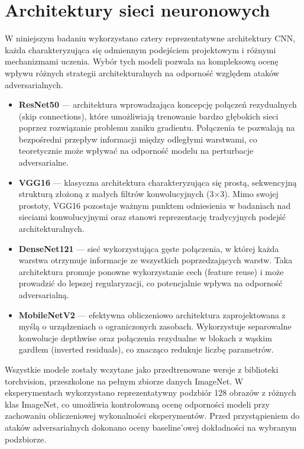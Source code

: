\documentclass[12pt]{article}
\begin{document}
\section{Architektury sieci neuronowych}

W niniejszym badaniu wykorzystano cztery reprezentatywne architektury CNN, każda charakteryzująca się odmiennym podejściem projektowym i różnymi mechanizmami uczenia. Wybór tych modeli pozwala na kompleksową ocenę wpływu różnych strategii architekturalnych na odporność względem ataków adversarialnych.

\begin{itemize}
    \item \textbf{ResNet50} \cite{he2016deep} --- architektura wprowadzająca koncepcję połączeń rezydualnych (skip connections), które umożliwiają trenowanie bardzo głębokich sieci poprzez rozwiązanie problemu zaniku gradientu. Połączenia te pozwalają na bezpośredni przepływ informacji między odległymi warstwami, co teoretycznie może wpływać na odporność modelu na perturbacje adversarialne.
    
    \item \textbf{VGG16} \cite{simonyan2014very} --- klasyczna architektura charakteryzująca się prostą, sekwencyjną strukturą złożoną z małych filtrów konwolucyjnych (3×3). Mimo swojej prostoty, VGG16 pozostaje ważnym punktem odniesienia w badaniach nad sieciami konwolucyjnymi oraz stanowi reprezentację tradycyjnych podejść architekturalnych.
    
    \item \textbf{DenseNet121} \cite{huang2017densely} --- sieć wykorzystująca gęste połączenia, w której każda warstwa otrzymuje informacje ze wszystkich poprzedzających warstw. Taka architektura promuje ponowne wykorzystanie cech (feature reuse) i może prowadzić do lepszej regularyzacji, co potencjalnie wpływa na odporność adversarialną.
    
    \item \textbf{MobileNetV2} \cite{sandler2018mobilenetv2} --- efektywna obliczeniowo architektura zaprojektowana z myślą o urządzeniach o ograniczonych zasobach. Wykorzystuje separowalne konwolucje depthwise oraz połączenia rezydualne w blokach z wąskim gardłem (inverted residuals), co znacząco redukuje liczbę parametrów.
\end{itemize}

Wszystkie modele zostały wczytane jako przedtrenowane wersje z biblioteki torchvision, przeszkolone na pełnym zbiorze danych ImageNet. W eksperymentach wykorzystano reprezentatywny podzbiór 128 obrazów z różnych klas ImageNet, co umożliwia kontrolowaną ocenę odporności modeli przy zachowaniu obliczeniowej wykonalności eksperymentów. Przed przystąpieniem do ataków adversarialnych dokonano oceny baseline'owej dokładności na wybranym podzbiorze.
\end{document}
